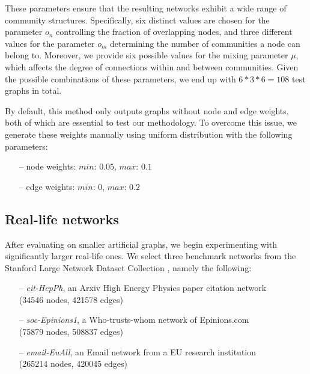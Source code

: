 \documentclass[pdflatex,sn-mathphys-num]{sn-jnl}
\begin{document}
These parameters ensure that the resulting networks exhibit a wide range of community structures. Specifically, six distinct values are chosen for the parameter $o_n$ controlling the fraction of overlapping nodes, and three different values for the parameter $o_m$ determining the number of communities a node can belong to. Moreover, we provide six possible values for the mixing parameter $\mu$, which affects the degree of connections within and between communities. Given the possible combinations of these parameters, we end up with $6*3*6 = 108$ test graphs in total.

By default, this method only outputs graphs without node and edge weights, both of which are essential to test our methodology. To overcome this issue, we generate these weights manually using uniform distribution with the following parameters:

\begin{itemize}
\item[--] node weights: $min$: $0.05$, $max$: $0.1$
\item[--] edge weights: $min$: $0$, $max$: $0.2$
\end{itemize}


\subsection{Real-life networks}\label{subsec_reallife}

After evaluating on smaller artificial graphs, we begin experimenting with significantly larger real-life ones. We select three benchmark networks from the Stanford Large Network Dataset Collection \cite{stanfordlarge}, namely the following:

\begin{itemize}
\setlength\itemsep{0.5em}
\item[--] \textit{cit-HepPh}, an Arxiv High Energy Physics paper citation network\\
(34546 nodes, 421578 edges)
\item[--] \textit{soc-Epinions1}, a Who-trusts-whom network of Epinions.com\\
(75879 nodes, 508837 edges)
\item[--] \textit{email-EuAll}, an Email network from a EU research institution\\
(265214 nodes, 420045 edges)
\end{itemize}
\end{document}
